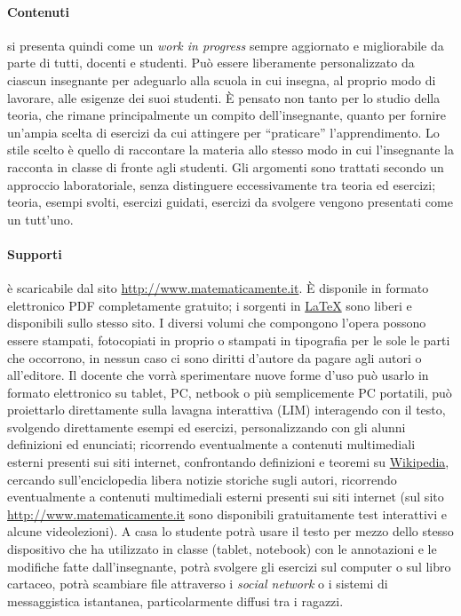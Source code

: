 \paragraph{Contenuti} \serie{} si presenta quindi come un \textit{work in progress} sempre aggiornato e migliorabile da parte di tutti, docenti e studenti. Può essere liberamente personalizzato da ciascun insegnante per adeguarlo alla scuola in cui insegna, al proprio modo di lavorare, alle esigenze dei suoi studenti. \`E pensato non tanto per lo studio della teoria, che rimane principalmente un compito dell'insegnante, quanto per fornire un'ampia scelta di esercizi da cui attingere per ``praticare'' l'apprendimento. Lo stile scelto è quello di raccontare la materia allo stesso modo in cui l'insegnante la racconta in classe di fronte agli studenti. Gli argomenti sono trattati secondo un approccio laboratoriale, senza distinguere eccessivamente tra teoria ed esercizi; teoria, esempi svolti, esercizi guidati, esercizi da svolgere vengono presentati come un tutt'uno.

\paragraph{Supporti}
\serie{} è scaricabile dal sito \url{http://www.matematicamente.it}. \`E disponile in formato elettronico PDF completamente gratuito; i sorgenti in \href{http://www.latex-project.org}{\LaTeX} sono liberi e disponibili sullo stesso sito. I diversi volumi che compongono l'opera possono essere stampati, fotocopiati in proprio o stampati in tipografia per le sole le parti che occorrono, in nessun caso ci sono diritti d'autore da pagare agli autori o all'editore. Il docente che vorrà sperimentare nuove forme d'uso può usarlo in formato elettronico su tablet, PC, netbook o più semplicemente PC portatili, può proiettarlo direttamente sulla lavagna interattiva (LIM) interagendo con il testo, svolgendo direttamente esempi ed esercizi, personalizzando con gli alunni definizioni ed enunciati; ricorrendo eventualmente a contenuti multimediali esterni presenti sui siti internet, confrontando definizioni e teoremi su \href{http://www.wikipedia.it}{Wikipedia}, cercando sull'enciclopedia libera notizie storiche sugli autori, ricorrendo eventualmente a contenuti multimediali esterni presenti sui siti internet (sul sito \url{http://www.matematicamente.it} sono disponibili gratuitamente test interattivi e alcune videolezioni). A casa lo studente potrà usare il testo per mezzo dello stesso dispositivo che ha utilizzato in classe (tablet, notebook) con le annotazioni e le modifiche fatte dall'insegnante, potrà svolgere gli esercizi sul computer o sul libro cartaceo, potrà scambiare file attraverso i \textit{social network} o i sistemi di messaggistica istantanea, particolarmente diffusi tra i ragazzi.

